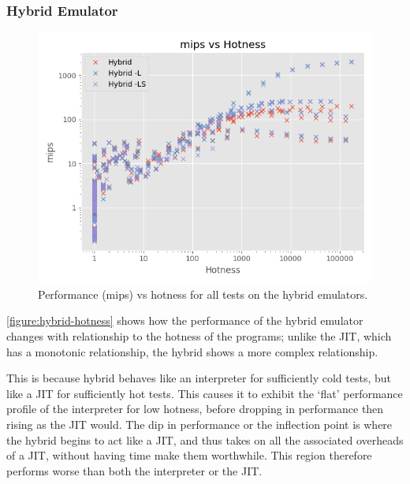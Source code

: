 \subsubsection{Hybrid Emulator}






\begin{figure}[H]
    \centering
    \includegraphics[scale=0.75]{output/graphs/scatter/hybrid/hotness.png}
    \caption{Performance (mips) vs hotness for all tests on the hybrid emulators.}
    \label{figure:hybrid-hotness}
\end{figure}

\autoref{figure:hybrid-hotness} shows how the performance of the hybrid emulator changes with relationship to the hotness of the programs; unlike the JIT, which has a monotonic relationship, the hybrid shows a more complex relationship.

This is because hybrid behaves like an interpreter for sufficiently cold tests, but like a JIT for sufficiently hot tests. This causes it to exhibit the `flat' performance profile of the interpreter for low hotness, before dropping in performance then rising as the JIT would. The dip in performance or the inflection point is where the hybrid begins to act like a JIT, and thus takes on all the associated overheads of a JIT, without having time make them worthwhile. This region therefore performs worse than both the interpreter or the JIT.

